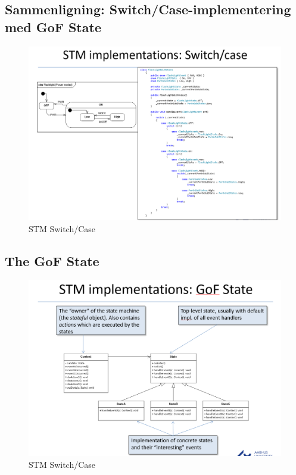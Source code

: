 \documentclass[../report.tex]{subfiles}
\begin{document}
\subsection{Sammenligning: Switch/Case-implementering med GoF State}

\begin{figure}[H]
    \centering
    \includegraphics[width = \textwidth]{pics/STM_impl_switch_case.PNG}
    \caption{STM Switch/Case}
    \label{fig:stm_switch_case}
\end{figure}

\subsection{The GoF State}
\begin{figure}[H]
    \centering
    \includegraphics[width = \textwidth]{pics/stm_state_gof.PNG}
    \caption{STM Switch/Case}
    \label{fig:stm_state_gof}
\end{figure}
\end{document}
